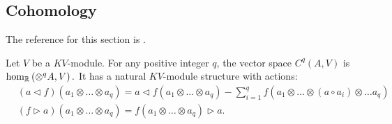 \subsection{Cohomology}
The reference for this section is \cite{Boyom2002}. 
\begin{defn}
    \label{def:kv_complex}
    Let $V$ be a $KV$-module. For any positive integer $q$, the vector space $C^q\left( A, V \right)$ is $\hom_{\mathbb{R}}\left( \otimes^q A, V \right).$ It has a natural
    $KV$-module structure with actions:
    \begin{equation}
        \label{eq:kv_cq}
        \begin{split}
            & \left( a \triangleleft f \right)\left( a_1 \otimes \dots \otimes a_q \right) = a \triangleleft f\left( a_1 \otimes \dots \otimes a_q \right) - \sum_{i=1}^q f\left( 
                a_1 \otimes \dots \otimes \left(a \circ a_i\right) \otimes \dots a_q
             \right) \\
             & \left( f \triangleright a \right)\left( a_1 \otimes \dots \otimes a_q \right) = f\left( a_1 \otimes \dots \otimes a_q \right) \triangleright a.
        \end{split}
    \end{equation}
\end{defn}


